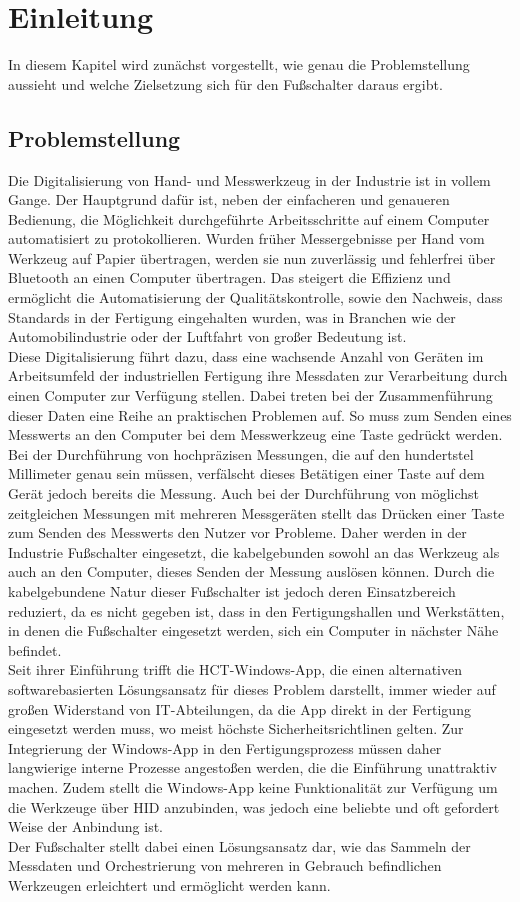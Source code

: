 \section{Einleitung}
In diesem Kapitel wird zunächst vorgestellt, wie genau die Problemstellung aussieht und welche Zielsetzung sich für den Fußschalter daraus ergibt.

\subsection{Problemstellung}
Die Digitalisierung von Hand- und Messwerkzeug in der Industrie ist in vollem Gange. Der Hauptgrund dafür ist, neben der einfacheren und genaueren Bedienung, die Möglichkeit durchgeführte Arbeitsschritte auf einem Computer automatisiert zu protokollieren. Wurden früher Messergebnisse per Hand vom Werkzeug auf Papier übertragen, werden sie nun zuverlässig und fehlerfrei über Bluetooth an einen Computer übertragen. Das steigert die Effizienz und ermöglicht die Automatisierung der Qualitätskontrolle, sowie den Nachweis, dass Standards in der Fertigung eingehalten wurden, was in Branchen wie der Automobilindustrie oder der Luftfahrt von großer Bedeutung ist.\\
Diese Digitalisierung führt dazu, dass eine wachsende Anzahl von Geräten im Arbeitsumfeld der industriellen Fertigung ihre Messdaten zur Verarbeitung durch einen Computer zur Verfügung stellen. Dabei treten bei der Zusammenführung dieser Daten eine Reihe an praktischen Problemen auf. So muss zum Senden eines Messwerts an den Computer bei dem Messwerkzeug eine Taste gedrückt werden. Bei der Durchführung von hochpräzisen Messungen, die auf den hundertstel Millimeter genau sein müssen, verfälscht dieses Betätigen einer Taste auf dem Gerät jedoch bereits die Messung. Auch bei der Durchführung von möglichst zeitgleichen Messungen mit mehreren Messgeräten stellt das Drücken einer Taste zum Senden des Messwerts den Nutzer vor Probleme. Daher werden in der Industrie Fußschalter eingesetzt, die kabelgebunden sowohl an das Werkzeug als auch an den Computer, dieses Senden der Messung auslösen können. Durch die kabelgebundene Natur dieser Fußschalter ist jedoch deren Einsatzbereich reduziert, da es nicht gegeben ist, dass in den Fertigungshallen und Werkstätten, in denen die Fußschalter eingesetzt werden, sich ein Computer in nächster Nähe befindet.\\
Seit ihrer Einführung trifft die \ac{HCT}-Windows-App, die einen alternativen softwarebasierten Lösungsansatz für dieses Problem darstellt, immer wieder auf großen Widerstand von IT-Abteilungen, da die App direkt in der Fertigung eingesetzt werden muss, wo meist höchste Sicherheitsrichtlinen gelten. Zur Integrierung der Windows-App in den Fertigungsprozess müssen daher langwierige interne Prozesse angestoßen werden, die die Einführung unattraktiv machen. Zudem stellt die Windows-App keine Funktionalität zur Verfügung um die Werkzeuge über \ac{HID} anzubinden, was jedoch eine beliebte und oft gefordert Weise der Anbindung ist.\\
Der Fußschalter stellt dabei einen Lösungsansatz dar, wie das Sammeln der Messdaten und Orchestrierung von mehreren in Gebrauch befindlichen Werkzeugen erleichtert und ermöglicht werden kann.

